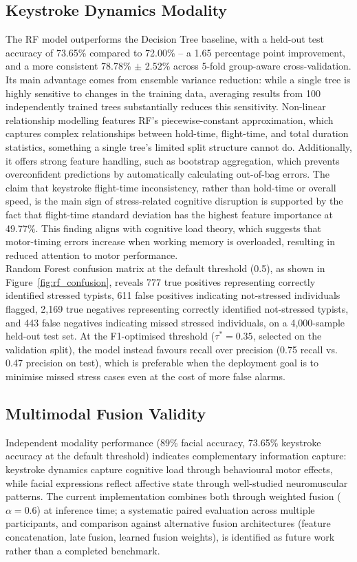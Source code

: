 \documentclass[fleqn,10pt]{wlscirep}
\begin{document}
\subsection*{Keystroke Dynamics Modality}
The RF model outperforms the Decision Tree baseline, with a held-out test accuracy of 73.65\% compared to 72.00\% -- a 1.65 percentage point improvement, and a more consistent 78.78\% $\pm$ 2.52\% across 5-fold group-aware cross-validation. Its main advantage comes from ensemble variance reduction: while a single tree is highly sensitive to changes in the training data, averaging results from 100 independently trained trees substantially reduces this sensitivity. Non-linear relationship modelling features RF's piecewise-constant approximation, which captures complex relationships between hold-time, flight-time, and total duration statistics, something a single tree's limited split structure cannot do. Additionally, it offers strong feature handling, such as bootstrap aggregation, which prevents overconfident predictions by automatically calculating out-of-bag errors.
The claim that keystroke flight-time inconsistency, rather than hold-time or overall speed, is the main sign of stress-related cognitive disruption is supported by the fact that flight-time standard deviation has the highest feature importance at 49.77\%. This finding aligns with cognitive load theory, which suggests that motor-timing errors increase when working memory is overloaded, resulting in reduced attention to motor performance.\\
Random Forest confusion matrix at the default threshold (0.5), as shown in Figure~\ref{fig:rf_confusion}, reveals 777 true positives representing correctly identified stressed typists, 611 false positives indicating not-stressed individuals flagged, 2,169 true negatives representing correctly identified not-stressed typists, and 443 false negatives indicating missed stressed individuals, on a 4,000-sample held-out test set. At the F1-optimised threshold ($\tau^* = 0.35$, selected on the validation split), the model instead favours recall over precision (0.75 recall vs. 0.47 precision on test), which is preferable when the deployment goal is to minimise missed stress cases even at the cost of more false alarms.

\subsection*{Multimodal Fusion Validity}
Independent modality performance (89\% facial accuracy, 73.65\% keystroke accuracy at the default threshold) indicates complementary information capture: keystroke dynamics capture cognitive load through behavioural motor effects, while facial expressions reflect affective state through well-studied neuromuscular patterns. The current implementation combines both through weighted fusion ($\alpha = 0.6$) at inference time; a systematic paired evaluation across multiple participants, and comparison against alternative fusion architectures (feature concatenation, late fusion, learned fusion weights), is identified as future work rather than a completed benchmark.
\end{document}
